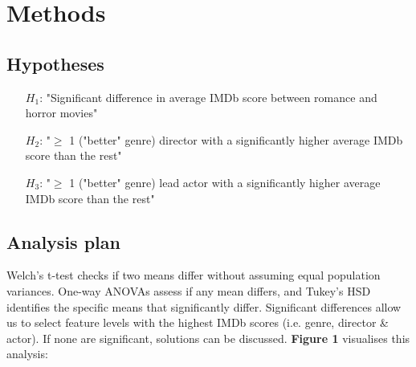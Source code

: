 \documentclass[11pt]{article}
\begin{document}
\section{Methods}

\subsection{Hypotheses}
\begin{enumerate}
    \item[$H_{1}$:] "Significant difference in average IMDb score between romance and horror movies"
    \item[$H_{2}$:] "$\ge$ 1 ("better" genre) director with a significantly higher average IMDb score than the rest"
    \item[$H_{3}$:] "$\ge$ 1 ("better" genre) lead actor with a significantly higher average IMDb score than the rest"
\end{enumerate}

\subsection{Analysis plan}

Welch’s t-test checks if two means differ without assuming equal population variances. One-way ANOVAs assess if any mean differs, and Tukey’s HSD identifies the specific means that significantly differ. Significant differences allow us to select feature levels with the highest IMDb scores (i.e. genre, director \& actor). If none are significant, solutions can be discussed. \textbf{Figure 1} visualises this analysis:
\end{document}
